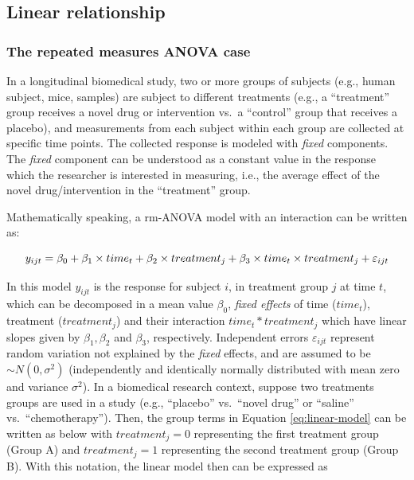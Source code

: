 \documentclass[
]{article}
\begin{document}
\hypertarget{linear-relationship}{%
\subsection{Linear relationship}\label{linear-relationship}}

\hypertarget{the-repeated-measures-anova-case}{%
\subsubsection{The repeated measures ANOVA case}\label{the-repeated-measures-anova-case}}

In a longitudinal biomedical study, two or more groups of subjects (e.g., human subject, mice, samples) are subject to different treatments (e.g., a ``treatment'' group receives a novel drug or intervention vs.~a ``control'' group that receives a placebo), and measurements from each subject within each group are collected at specific time points. The collected response is modeled with \emph{fixed} components. The \emph{fixed} component can be understood as a constant value in the response which the researcher is interested in measuring, i.e., the average effect of the novel drug/intervention in the ``treatment'' group.

Mathematically speaking, a rm-ANOVA model with an interaction can be written as:

\begin{equation}
y_{ijt} = \beta_0+\beta_1 \times time_{t} +\beta_2 \times treatment_{j} +\beta_3 \times time_{t}\times treatment_{j}+\varepsilon_{ijt}\\ 
\label{eq:linear-model}
\end{equation}

In this model \(y_{ijt}\) is the response for subject \(i\), in treatment group \(j\) at time \(t\), which can be decomposed in a mean value \(\beta_0\), \emph{fixed effects} of time (\(time_t\)), treatment (\(treatment_j\)) and their interaction \(time_t*treatment_j\) which have linear slopes given by \(\beta_1, \beta_2\) and \(\beta_3\), respectively. Independent errors \(\varepsilon_{ijt}\) represent random variation not explained by the \emph{fixed} effects, and are assumed to be \(\sim N(0,\sigma^2)\) (independently and identically normally distributed with mean zero and variance \(\sigma^2\)).
In a biomedical research context, suppose two treatments groups are used in a study (e.g., ``placebo'' vs.~``novel drug'' or ``saline'' vs.~``chemotherapy''). Then, the group terms in Equation \eqref{eq:linear-model} can be written as below with \(treatment_j=0\) representing the first treatment group (Group A) and \(treatment_j=1\) representing the second treatment group (Group B). With this notation, the linear model then can be expressed as
\end{document}
